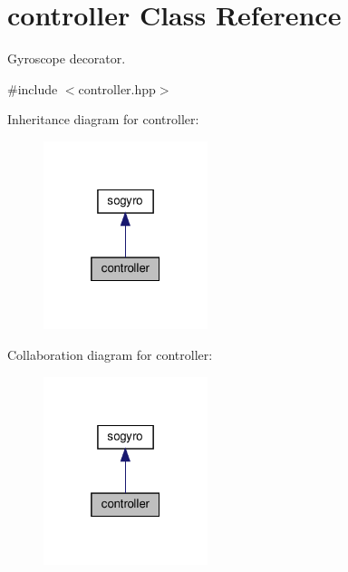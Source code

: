 \hypertarget{classcontroller}{}\section{controller Class Reference}
\label{classcontroller}


Gyroscope decorator.  




{\ttfamily \#include $<$controller.\+hpp$>$}



Inheritance diagram for controller\+:
\nopagebreak
\begin{figure}[H]
\begin{center}
\leavevmode
\includegraphics[width=136pt]{classcontroller__inherit__graph}
\end{center}
\end{figure}


Collaboration diagram for controller\+:
\nopagebreak
\begin{figure}[H]
\begin{center}
\leavevmode
\includegraphics[width=136pt]{classcontroller__coll__graph}
\end{center}
\end{figure}
